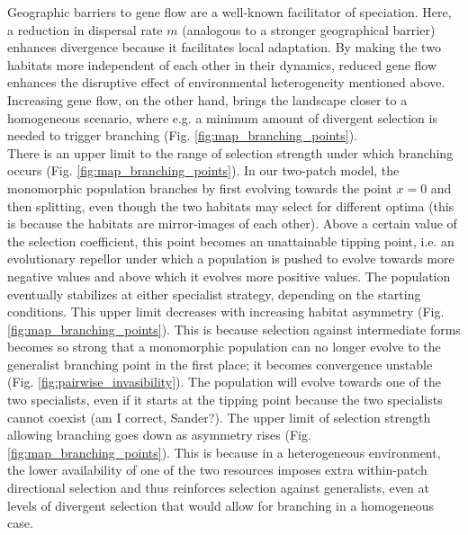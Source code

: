 
Geographic barriers to gene flow are a well-known facilitator of speciation. Here, a reduction in dispersal rate $m$ (analogous to a stronger geographical barrier) enhances divergence because it facilitates local adaptation. By making the two habitats more independent of each other in their dynamics, reduced gene flow enhances the disruptive effect of environmental heterogeneity mentioned above. Increasing gene flow, on the other hand, brings the landscape closer to a homogeneous scenario, where e.g. a minimum amount of divergent selection is needed to trigger branching (Fig. \ref{fig:map_branching_points}).\\


There is an upper limit to the range of selection strength under which branching occurs (Fig. \ref{fig:map_branching_points}). In our two-patch model, the monomorphic population branches by first evolving towards the point $x = 0$ and then splitting, even though the two habitats may select for different optima (this is because the habitats are mirror-images of each other). Above a certain value of the selection coefficient, this point becomes an unattainable tipping point, i.e. an evolutionary repellor under which a population is pushed to evolve towards more negative values and above which it evolves more positive values. The population eventually stabilizes at either specialist strategy, depending on the starting conditions. This upper limit decreases with increasing habitat asymmetry (Fig. \ref{fig:map_branching_points}). This is because selection against intermediate forms becomes so strong that a monomorphic population can no longer evolve to the generalist branching point in the first place; it becomes convergence unstable (Fig. \ref{fig:pairwise_invasibility}). The population will evolve towards one of the two specialists, even if it starts at the tipping point because the two specialists cannot coexist (am I correct, Sander?). The upper limit of selection strength allowing branching goes down as asymmetry rises (Fig. \ref{fig:map_branching_points}). This is because in a heterogeneous environment, the lower availability of one of the two resources imposes extra within-patch directional selection and thus reinforces selection against generalists, even at levels of divergent selection that would allow for branching in a homogeneous case.

